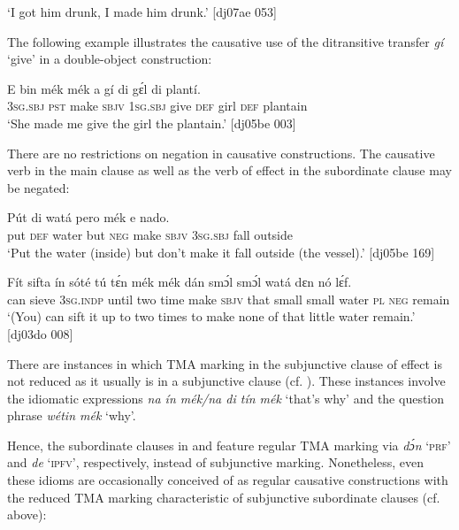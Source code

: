\glt ‘I got him drunk, I made him drunk.’ [dj07ae 053]
\z

The following example illustrates the causative use of the ditransitive transfer \textit{gí} ‘give’ in a double-object construction: 


\ea%
    \label{ex:key:1326}
    \gll E    bin  mék    mék    a    gí  di  gɛ́l  di  plantí.\\
\textsc{3sg.sbj}  \textsc{pst}  make  \textsc{sbjv}    \textsc{1sg.sbj}  give  \textsc{def}  girl  \textsc{def}  plantain\\

\glt ‘She made me give the girl the plantain.’ [dj05be 003]
\z

There are no restrictions on negation in causative constructions. The causative verb in the main clause  as well as the verb of effect in the subordinate clause  may be negated: 


\ea%
    \label{ex:key:1327}
    \gll Pút  di  watá  pero        mék    e      nado.\\
put  \textsc{def}  water  but    \textsc{neg}  make  \textsc{sbjv}    \textsc{3sg.sbj}  fall    outside\\

\glt ‘Put the water (inside) but don’t make it fall outside (the vessel).’ [dj05be 169]
\z


\ea%
    \label{ex:key:1328}
    \gll Fít  sifta    ín    sóté    tú  tɛ́n    mék    mék
dán  smɔ́l  smɔ́l  watá  dɛn  nó  lɛ́f.\\
can  sieve  \textsc{3sg.indp}  until  two  time    make  \textsc{sbjv}
that  small  small  water  \textsc{pl}  \textsc{neg}  remain\\

\glt ‘(You) can sift it up to two times to make none of that little
water remain.’ [dj03do 008]
\z

There are instances in which TMA marking in the subjunctive clause of effect is not reduced as it usually is in a subjunctive clause (cf. ). These instances involve the idiomatic expressions \textit{na ín mék}\textit{\textup{/}}\textit{na di tín mék} ‘that’s why’ and the question phrase \textit{wétin mék} ‘why’.


Hence, the subordinate clauses in  and  feature regular TMA marking via \textit{dɔ́n} ‘\textsc{prf}’ and \textit{de} ‘\textsc{ipfv}’, respectively, instead of subjunctive marking. Nonetheless, even these idioms are occasionally conceived of as regular causative constructions with the reduced TMA marking characteristic of subjunctive subordinate clauses (cf.  above):



